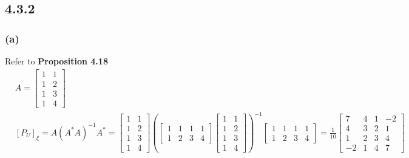 \documentclass{article}
\begin{document}
\subsection*{4.3.2}
\subsubsection*{(a)}
Refer to \textbf{Proposition 4.18}
\begin{equation*}
    \begin{split}
        &A = \begin{bmatrix}
            1 & 1 \\
            1 & 2 \\
            1 & 3 \\
            1 & 4
        \end{bmatrix}\\
        &[P_U]_\xi = A(A^*A)^{-1}A^* = \begin{bmatrix}
            1 & 1 \\
            1 & 2 \\
            1 & 3 \\
            1 & 4
        \end{bmatrix} (\begin{bmatrix}
            1 & 1 & 1 & 1 \\
            1 & 2 & 3 & 4
        \end{bmatrix} \begin{bmatrix}
            1 & 1 \\
            1 & 2 \\
            1 & 3 \\
            1 & 4
        \end{bmatrix})^{-1} \begin{bmatrix}
            1 & 1 & 1 & 1 \\
            1 & 2 & 3 & 4
        \end{bmatrix} = \frac{1}{10}\begin{bmatrix}
            7 & 4 & 1 & -2 \\
            4 & 3 & 2 & 1 \\
            1 & 2 & 3 &4 \\
            -2 & 1 & 4 & 7
        \end{bmatrix}
    \end{split}
\end{equation*}
\end{document}
